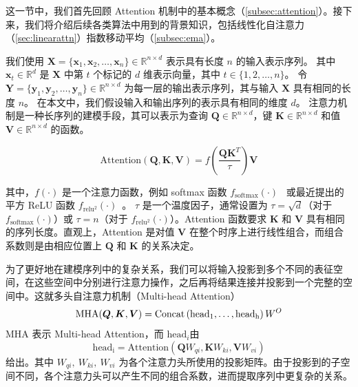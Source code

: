 这一节中，我们首先回顾 Attention 机制中的基本概念（\ref{subsec:attention}）。接下来，我们将介绍后续各类算法中用到的背景知识，包括线性化自注意力（\ref{sec:linearattn}）指数移动平均（\ref{subsec:ema}）。


\label{subsec:attention}
我们使用 $\boldsymbol{X} = \{\mathbf{x}_1, \mathbf{x}_2, \ldots, \mathbf{x}_n\} \in \mathbb{R}^{n\times d}$ 表示具有长度 $n$ 的输入表示序列。
其中 $\mathbf{x}_t \in \mathbb{R}^{d}$ 是 $\boldsymbol{X}$ 中第 $t$ 个标记的 $d$ 维表示向量，其中 $t \in \{1, 2, \ldots, n\}$。
令 $\boldsymbol{Y} =\{\mathbf{y}_1, \mathbf{y}_2, \ldots, \mathbf{y}_n\} \in \mathbb{R}^{n\times d}$ 为每一层的输出表示序列，其与输入 $\boldsymbol{X}$ 具有相同的长度 $n$。
在本文中，我们假设输入和输出序列的表示具有相同的维度 $d$。
\label{subsubsec:attention}
注意力机制是一种长序列的建模手段，其可以表示为查询 $\boldsymbol{Q}\in \mathbb{R}^{n\times d} $，键 $\boldsymbol{K}\in \mathbb{R}^{n\times d}$ 和值 $\boldsymbol{V}\in \mathbb{R}^{n\times d}$ 的函数。

\begin{equation}
    \label{eq:attention}
    \mathrm{Attention}(\boldsymbol{Q}, \boldsymbol{K}, \boldsymbol{V})=f\left( \frac{\boldsymbol{Q} \boldsymbol{K}^T}{\tau} \right) \boldsymbol{V}
\end{equation}

其中，$f(\cdot)$ 是一个注意力函数，例如 softmax 函数 $f_{\mathrm{softmax}}(\cdot)$~\cite{bahdanau2015neural} 或最近提出的平方 ReLU 函数 $f_{\mathrm{relu^2}}(\cdot)$~\cite{hua2022transformer}。
$\tau$ 是一个温度因子，通常设置为 $\tau = \sqrt{d}$（对于 $f_{\mathrm{softmax}}(\cdot)$）或 $\tau = n$（对于 $f_{\mathrm{relu^2}}(\cdot)$）。Attention 函数要求 $\boldsymbol{K}$ 和 $\boldsymbol{V}$ 具有相同的序列长度。直观上，Attention 是对值 $\boldsymbol{V}$ 在整个时序上进行线性组合，而组合系数则是由相应位置上 $\boldsymbol{Q}$ 和 $\boldsymbol{K}$ 的关系决定。

为了更好地在建模序列中的复杂关系，我们可以将输入投影到多个不同的表征空间，在这些空间中分别进行注意力操作，之后再将结果连接并投影到一个完整的空间中。这就多头自注意力机制（Multi-head Attention）
\begin{equation}
\mathrm{MHA}(\boldsymbol{Q}, \boldsymbol{K}, \boldsymbol{V}) =\mathrm{Concat}\left(\mathrm{head}_1, \ldots, \mathrm{head}_{\mathrm{h}}\right) W^O \\
\end{equation}
MHA 表示 Multi-head Attention，而 $\mathrm{head}_i$由
\begin{equation}
    {\mathrm{head}_{\mathrm{i}}}  =\mathrm { Attention }\left(\boldsymbol Q W_{qi}, \boldsymbol K W_{ki}, \boldsymbol V W_{vi}\right)
\end{equation}
给出。其中 $W_{qi}, \ W_{ki}, \ W_{vi}$ 为各个注意力头所使用的投影矩阵。由于投影到的子空间不同，各个注意力头可以产生不同的组合系数，进而提取序列中更复杂的关系。

